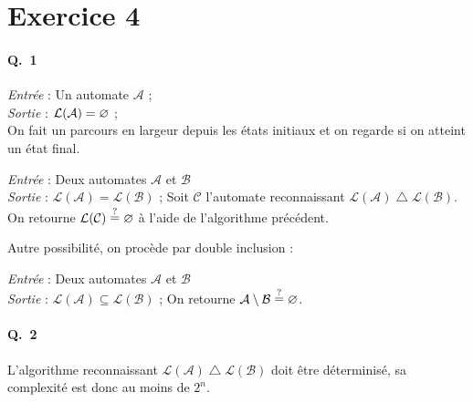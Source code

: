 \section{Exercice 4}

\paragraph{Q.\ 1}

\begin{algo}
	\textsl{Entrée} : Un automate $\mathcal{A}$\/ ;\\
	\textsl{Sortie} : $\mathcal{L}(\mathcal{A}) = \varnothing$\/ ;\\
	On fait un parcours en largeur depuis les états initiaux et on regarde si on atteint un état final.
\end{algo}

\begin{algo}[Nathan F.]
	{\sl Entrée} : Deux automates $\mathcal{A}$\/ et $\mathcal{B}$\/ \\
	{\sl Sortie} : $\mathcal{L}(\mathcal{A}) = \mathcal{L}(\mathcal{B})$\/ ;
	Soit $\mathcal{C}$\/ l'automate reconnaissant $\mathcal{L}(\mathcal{A}) \mathbin\triangle \mathcal{L}(\mathcal{B})$. On retourne $\mathcal{L}(\mathcal{C}) \mathrel{\displaystyle\mathop=^?} \varnothing$\/ à l'aide de l'algorithme précédent.
\end{algo}

Autre possibilité, on procède par double inclusion :

\begin{algo}[$\subseteq$]
	{\sl Entrée} : Deux automates $\mathcal{A}$\/ et $\mathcal{B}$\/ \\
	{\sl Sortie} : $\mathcal{L}(\mathcal{A}) \subseteq \mathcal{L}(\mathcal{B})$\/ ;
	On retourne $\mathcal{A} \setminus \mathcal{B} \mathrel{\displaystyle\mathop=^?} \varnothing$.
\end{algo}

\paragraph{Q.\ 2}
L'algorithme reconnaissant $\mathcal{L}(\mathcal{A}) \mathrel\triangle \mathcal{L}(\mathcal{B})$\/ doit être déterminisé, sa complexité est donc au moins de $2^n$.
